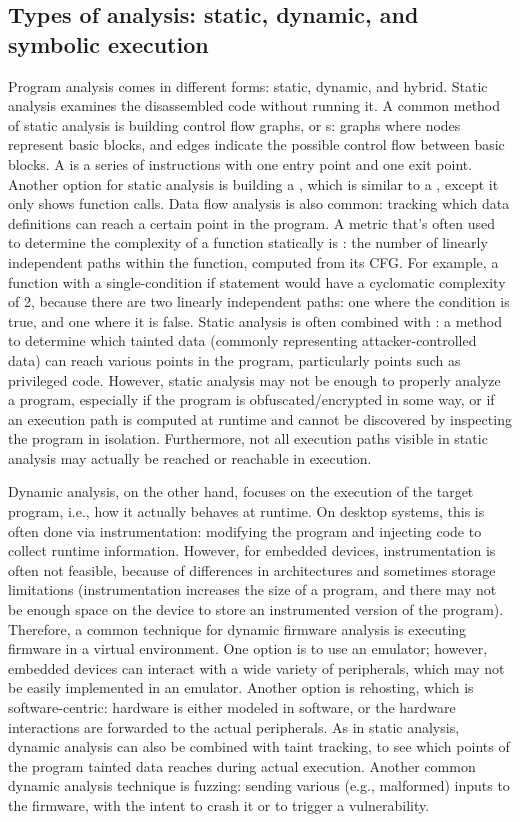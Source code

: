 \subsection{Types of analysis: static, dynamic, and symbolic execution}
Program analysis comes in different forms: static, dynamic, and hybrid.
Static analysis examines the disassembled code without running it.
A common method of static analysis is building control flow graphs, or s: graphs where nodes represent basic blocks, and edges indicate the possible control flow between basic blocks.
A  is a series of instructions with one entry point and one exit point.
Another option for static analysis is building a , which is similar to a , except it only shows function calls.
Data flow analysis is also common: tracking which data definitions can reach a certain point in the program.
A metric that's often used to determine the complexity of a function statically is : the number of linearly independent paths within the function, computed from its CFG.
For example, a function with a single-condition if statement would have a cyclomatic complexity of 2, because there are two linearly independent paths: one where the condition is true, and one where it is false.
Static analysis is often combined with : a method to determine which tainted data (commonly representing attacker-controlled data) can reach various points in the program, particularly  points such as privileged code.
However, static analysis may not be enough to properly analyze a program, especially if the program is obfuscated/encrypted in some way, or if an execution path is computed at runtime and cannot be discovered by inspecting the program in isolation.
Furthermore, not all execution paths visible in static analysis may actually be reached or reachable in execution.

Dynamic analysis, on the other hand, focuses on the execution of the target program, i.e., how it actually behaves at runtime.
On desktop systems, this is often done via instrumentation: modifying the program and injecting code to collect runtime information.
However, for embedded devices, instrumentation is often not feasible, because of differences in architectures and sometimes storage limitations (instrumentation increases the size of a program, and there may not be enough space on the device to store an instrumented version of the program).
Therefore, a common technique for dynamic firmware analysis is executing firmware in a virtual environment.
One option is to use an emulator; however, embedded devices can interact with a wide variety of peripherals, which may not be easily implemented in an emulator.
Another option is rehosting, which is software-centric: hardware is either modeled in software, or the hardware interactions are forwarded to the actual peripherals.
As in static analysis, dynamic analysis can also be combined with taint tracking, to see which points of the program tainted data reaches during actual execution.
Another common dynamic analysis technique is fuzzing: sending various (e.g., malformed) inputs to the firmware, with the intent to crash it or to trigger a vulnerability.

